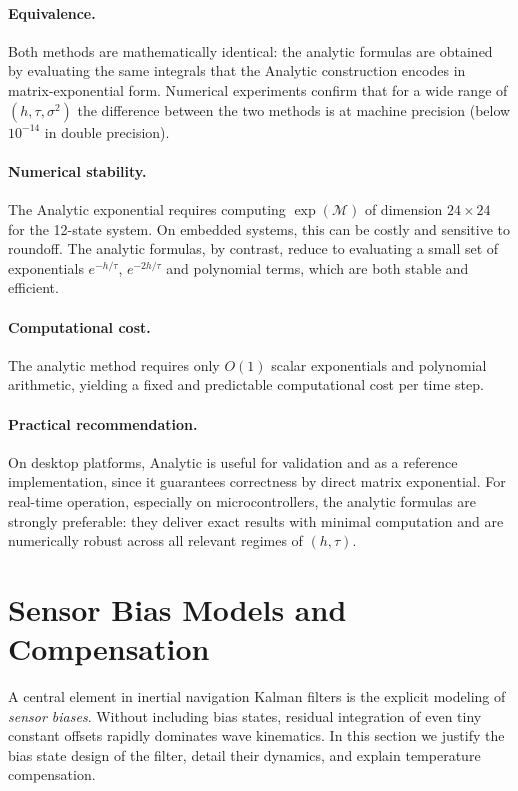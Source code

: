 \documentclass[10pt]{extarticle}
\begin{document}
\paragraph{Equivalence.}
Both methods are mathematically identical: the analytic formulas
are obtained by evaluating the same integrals that the Analytic
construction encodes in matrix-exponential form. Numerical experiments
confirm that for a wide range of $(h,\tau,\sigma^2)$ the difference
between the two methods is at machine precision (below $10^{-14}$ in
double precision).

\paragraph{Numerical stability.}
The Analytic exponential requires computing $\exp(\mathcal{M})$ of
dimension $24 \times 24$ for the 12-state system. On embedded systems,
this can be costly and sensitive to roundoff. The analytic formulas,
by contrast, reduce to evaluating a small set of exponentials
$e^{-h/\tau}$, $e^{-2h/\tau}$ and polynomial terms, which are both
stable and efficient.

\paragraph{Computational cost.}
The analytic method requires only $O(1)$ scalar exponentials and
polynomial arithmetic, yielding a fixed and predictable computational
cost per time step. 

\paragraph{Practical recommendation.}
On desktop platforms, Analytic is useful for validation and as a
reference implementation, since it guarantees correctness by direct
matrix exponential. For real-time operation, especially on microcontrollers,
the analytic formulas are strongly preferable: they deliver exact
results with minimal computation and are numerically robust across
all relevant regimes of $(h,\tau)$.

\section{Sensor Bias Models and Compensation}
\label{sec:biases}

A central element in inertial navigation Kalman filters is the explicit modeling of 
\emph{sensor biases}. Without including bias states, residual integration of even tiny 
constant offsets rapidly dominates wave kinematics. In this section we justify the bias 
state design of the filter, detail their dynamics, and explain temperature compensation.
\end{document}
